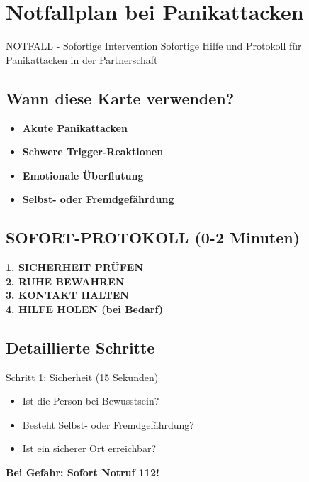 
\section{Notfallplan bei Panikattacken}
\label{sec:notfall-panikattacken}

\begin{ctmmRedBox}{NOTFALL - Sofortige Intervention}
Sofortige Hilfe und Protokoll für Panikattacken in der Partnerschaft
\end{ctmmRedBox}

\subsection{Wann diese Karte verwenden?}
\begin{itemize}
    \item \textcolor{ctmmRed}{\textbf{Akute Panikattacken}}
    \item \textcolor{ctmmRed}{\textbf{Schwere Trigger-Reaktionen}}
    \item \textcolor{ctmmRed}{\textbf{Emotionale Überflutung}}
    \item \textcolor{ctmmRed}{\textbf{Selbst- oder Fremdgefährdung}}
\end{itemize}

\subsection{SOFORT-PROTOKOLL (0-2 Minuten)}

\begin{center}
\begin{tcolorbox}[colback=ctmmRed!10, colframe=ctmmRed, title=\textbf{PHASE 1: SICHERHEIT}]
\Large
\textbf{1. SICHERHEIT PRÜFEN} \\
\textbf{2. RUHE BEWAHREN} \\
\textbf{3. KONTAKT HALTEN} \\
\textbf{4. HILFE HOLEN (bei Bedarf)}
\end{tcolorbox}
\end{center}

\subsection{Detaillierte Schritte}

\begin{ctmmRedBox}{Schritt 1: Sicherheit (15 Sekunden)}
\begin{itemize}
    \item Ist die Person bei Bewusstsein?
    \item Besteht Selbst- oder Fremdgefährdung?
    \item Ist ein sicherer Ort erreichbar?
\end{itemize}
\textbf{Bei Gefahr: Sofort Notruf 112!}
\end{ctmmRedBox}

